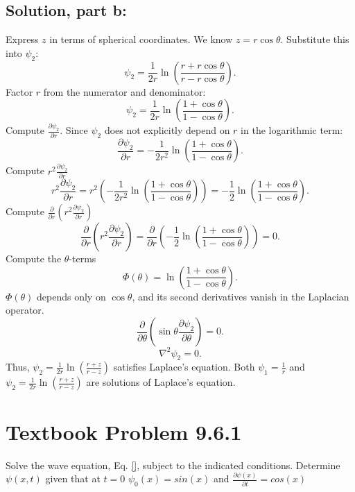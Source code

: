 \documentclass[12pt]{article}
\begin{document}
    \subsection*{Solution, part b:}
        Express \( z \) in terms of spherical coordinates.
        We know \( z = r \cos \theta \). Substitute this into \( \psi_2 \):
        \[
        \psi_2 = \frac{1}{2r} \ln\left(\frac{r + r \cos \theta}{r - r \cos \theta}\right).
        \]
        Factor \( r \) from the numerator and denominator:
        \[
        \psi_2 = \frac{1}{2r} \ln\left(\frac{1 + \cos \theta}{1 - \cos \theta}\right).
        \]
        Compute \( \frac{\partial \psi_2}{\partial r} \).
        Since \( \psi_2 \) does not explicitly depend on \( r \) in the logarithmic term:
        \[
        \frac{\partial \psi_2}{\partial r} = -\frac{1}{2r^2} \ln\left(\frac{1 + \cos \theta}{1 - \cos \theta}\right).
        \]
        Compute \( r^2 \frac{\partial \psi_2}{\partial r} \)
        \[
        r^2 \frac{\partial \psi_2}{\partial r} = r^2 \left( -\frac{1}{2r^2} \ln\left(\frac{1 + \cos \theta}{1 - \cos \theta}\right) \right) = -\frac{1}{2} \ln\left(\frac{1 + \cos \theta}{1 - \cos \theta}\right).
        \]
        Compute \( \frac{\partial}{\partial r} \left( r^2 \frac{\partial \psi_2}{\partial r} \right) \)
        \[
        \frac{\partial}{\partial r} \left( r^2 \frac{\partial \psi_2}{\partial r} \right) = \frac{\partial}{\partial r} \left( -\frac{1}{2} \ln\left(\frac{1 + \cos \theta}{1 - \cos \theta}\right) \right) = 0.
        \]
        Compute the \(\theta\)-terms
        \[
        \Phi(\theta) = \ln\left(\frac{1 + \cos \theta}{1 - \cos \theta}\right).
        \]
        \(\Phi(\theta)\) depends only on \(\cos \theta\), and its second derivatives vanish in the Laplacian operator.
        \[
        \frac{\partial}{\partial \theta} \left( \sin \theta \frac{\partial \psi_2}{\partial \theta} \right) = 0.
        \]
        \[
        \nabla^2 \psi_2 = 0.
        \]
        Thus, \( \psi_2 = \frac{1}{2r} \ln\left(\frac{r+z}{r-z}\right) \) satisfies Laplace’s equation.
        Both \( \psi_1 = \frac{1}{r} \) and \( \psi_2 = \frac{1}{2r} \ln\left(\frac{r+z}{r-z}\right) \) are solutions of Laplace’s equation.

\section*{Textbook Problem 9.6.1}
    Solve the wave equation, Eq. \ref{}, subject to the indicated conditions.
    Determine $\psi(x,t)$ given that at $t=0$ $\psi_0(x) = sin(x)$ and $\frac{\partial \psi(x)}{\partial t} = cos(x)$
\end{document}
